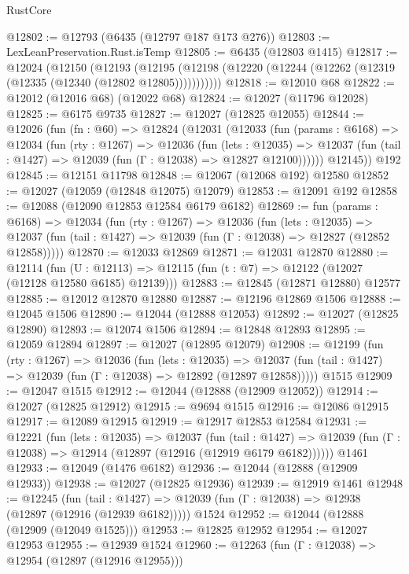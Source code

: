 \begin{lexlean}{RustCore}
\begin{coremodule}
@12802 := @12793 (@6435 (@12797 @187 @173 @276))
@12803 := LexLeanPreservation.Rust.isTemp
@12805 := @6435 (@12803 @1415)
@12817 := @12024
    (@12150
      (@12193
        (@12195 (@12198 (@12220 (@12244 (@12262 (@12319 (@12335 (@12340 (@12802 @12805)))))))))))
@12818 := @12010 @68
@12822 := @12012 (@12016 @68) (@12022 @68)
@12824 := @12027 (@11796 @12028)
@12825 := @6175 @9735
@12827 := @12027 (@12825 @12055)
@12844 := @12026
    (fun (fn : @60) =>
    @12824
      (@12031
        (@12033
          (fun (params : @6168) =>
          @12034
            (fun (rty : @1267) =>
            @12036
              (fun (lets : @12035) =>
              @12037 (fun (tail : @1427) => @12039 (fun (Γ : @12038) => @12827 @12100))))))
        @12145))
    @192
@12845 := @12151 @11798
@12848 := @12067 (@12068 @192) @12580
@12852 := @12027 (@12059 (@12848 @12075) @12079)
@12853 := @12091 @192
@12858 := @12088 (@12090 @12853 @12584 @6179 @6182)
@12869 := fun (params : @6168) =>
  @12034
    (fun (rty : @1267) =>
    @12036
      (fun (lets : @12035) =>
      @12037 (fun (tail : @1427) => @12039 (fun (Γ : @12038) => @12827 (@12852 @12858)))))
@12870 := @12033 @12869
@12871 := @12031 @12870
@12880 := @12114
    (fun (U : @12113) => @12115 (fun (t : @7) => @12122 (@12027 (@12128 @12580 @6185) @12139)))
@12883 := @12845 (@12871 @12880) @12577
@12885 := @12012 @12870 @12880
@12887 := @12196 @12869 @1506
@12888 := @12045 @1506
@12890 := @12044 (@12888 @12053)
@12892 := @12027 (@12825 @12890)
@12893 := @12074 @1506
@12894 := @12848 @12893
@12895 := @12059 @12894
@12897 := @12027 (@12895 @12079)
@12908 := @12199
    (fun (rty : @1267) =>
    @12036
      (fun (lets : @12035) =>
      @12037 (fun (tail : @1427) => @12039 (fun (Γ : @12038) => @12892 (@12897 @12858)))))
    @1515
@12909 := @12047 @1515
@12912 := @12044 (@12888 (@12909 @12052))
@12914 := @12027 (@12825 @12912)
@12915 := @9694 @1515
@12916 := @12086 @12915
@12917 := @12089 @12915
@12919 := @12917 @12853 @12584
@12931 := @12221
    (fun (lets : @12035) =>
    @12037
      (fun (tail : @1427) =>
      @12039 (fun (Γ : @12038) => @12914 (@12897 (@12916 (@12919 @6179 @6182))))))
    @1461
@12933 := @12049 (@1476 @6182)
@12936 := @12044 (@12888 (@12909 @12933))
@12938 := @12027 (@12825 @12936)
@12939 := @12919 @1461
@12948 := @12245
    (fun (tail : @1427) => @12039 (fun (Γ : @12038) => @12938 (@12897 (@12916 (@12939 @6182)))))
    @1524
@12952 := @12044 (@12888 (@12909 (@12049 @1525)))
@12953 := @12825 @12952
@12954 := @12027 @12953
@12955 := @12939 @1524
@12960 := @12263 (fun (Γ : @12038) => @12954 (@12897 (@12916 @12955)))

\end{coremodule}
\end{lexlean}

